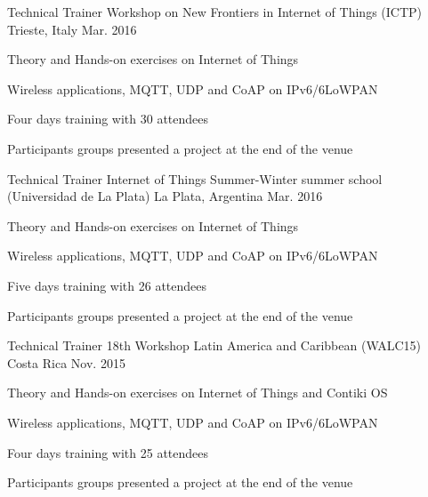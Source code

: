 \begin{cventries}
  \cventry
    {Technical Trainer} %
    {Workshop on New Frontiers in Internet of Things (ICTP)} %
    {Trieste, Italy} %
    {Mar. 2016} %
    {
      \begin{cvitems} %
        \item {Theory and Hands-on exercises on Internet of Things}
        \item {Wireless applications, MQTT, UDP and CoAP on IPv6/6LoWPAN}
        \item {Four days training with 30 attendees}
        \item {Participants groups presented a project at the end of the venue }
      \end{cvitems}
    }

  \cventry
    {Technical Trainer} %
    {Internet of Things Summer-Winter summer school (Universidad de La Plata)} %
    {La Plata, Argentina} %
    {Mar. 2016} %
    {
      \begin{cvitems} %
        \item {Theory and Hands-on exercises on Internet of Things}
        \item {Wireless applications, MQTT, UDP and CoAP on IPv6/6LoWPAN}
        \item {Five days training with 26 attendees}
        \item {Participants groups presented a project at the end of the venue }
      \end{cvitems}
    }

  \cventry
    {Technical Trainer} %
    {18th Workshop Latin America and Caribbean (WALC15)} %
    {Costa Rica} %
    {Nov. 2015} %
    {
      \begin{cvitems} %
        \item {Theory and Hands-on exercises on Internet of Things and Contiki OS}
        \item {Wireless applications, MQTT, UDP and CoAP on IPv6/6LoWPAN}
        \item {Four days training with 25 attendees}
        \item {Participants groups presented a project at the end of the venue }
      \end{cvitems}
    }


\end{cventries}
